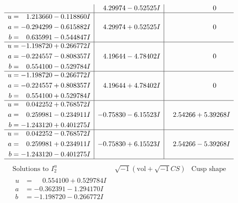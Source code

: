 \documentclass[1p]{elsarticle_modified}
\theoremstyle{definition}
\newcommand{\I}{\sqrt{-1}}
\begin{document}
$$\begin{array}{c|c|c}
 & \phantom{-}4.29974 - 0.52525 I & \phantom{-0.000000 } 0 \\ \hline\begin{aligned}
u &= \phantom{-}1.213660 - 0.118860 I \\
a &= -0.294299 - 0.615882 I \\
b &= \phantom{-}0.635991 - 0.544847 I\end{aligned}
 & \phantom{-}4.29974 + 0.52525 I & \phantom{-0.000000 } 0 \\ \hline\begin{aligned}
u &= -1.198720 + 0.266772 I \\
a &= -0.224557 - 0.808357 I \\
b &= \phantom{-}0.554100 - 0.529784 I\end{aligned}
 & \phantom{-}4.19644 - 4.78402 I & \phantom{-0.000000 } 0 \\ \hline\begin{aligned}
u &= -1.198720 - 0.266772 I \\
a &= -0.224557 + 0.808357 I \\
b &= \phantom{-}0.554100 + 0.529784 I\end{aligned}
 & \phantom{-}4.19644 + 4.78402 I & \phantom{-0.000000 } 0 \\ \hline\begin{aligned}
u &= \phantom{-}0.042252 + 0.768572 I \\
a &= \phantom{-}0.259981 - 0.234911 I \\
b &= -1.243120 + 0.401275 I\end{aligned}
 & -0.75830 - 6.15523 I & \phantom{-}2.54266 + 5.39268 I \\ \hline\begin{aligned}
u &= \phantom{-}0.042252 - 0.768572 I \\
a &= \phantom{-}0.259981 + 0.234911 I \\
b &= -1.243120 - 0.401275 I\end{aligned}
 & -0.75830 + 6.15523 I & \phantom{-}2.54266 - 5.39268 I\\
 \hline 
 \end{array}$$\newpage$$\begin{array}{c|c|c}  
\text{Solutions to }I^u_{2}& \I (\text{vol} + \sqrt{-1}CS) & \text{Cusp shape}\\
 \hline 
\begin{aligned}
u &= \phantom{-}0.554100 + 0.529784 I \\
a &= -0.362391 - 1.294170 I \\
b &= -1.198720 - 0.266772 I\end{aligned}

\end{array}$$
\end{document}

